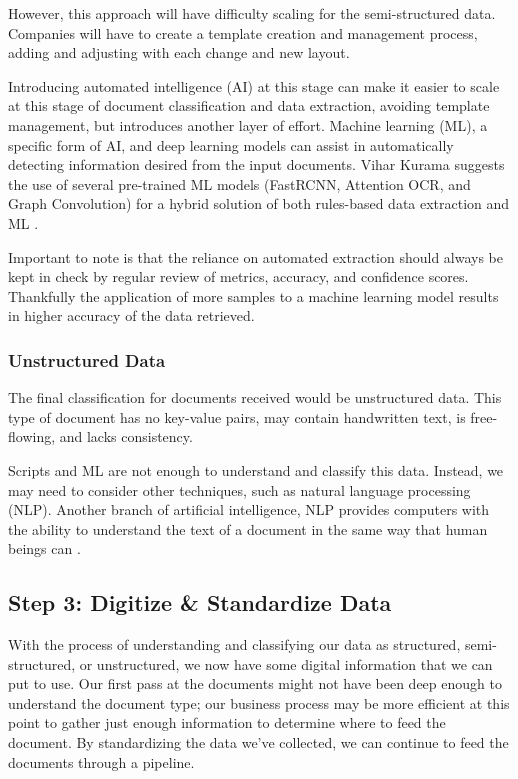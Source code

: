 \documentclass[conference]{IEEEtran}
\begin{document}
However, this approach will have difficulty scaling for the semi-structured data. Companies will have to create a template creation and management process, adding and adjusting with each change and new layout.

Introducing automated intelligence (AI) at this stage can make it easier to scale at this stage of document classification and data extraction, avoiding template management, but introduces another layer of effort. Machine learning (ML), a specific form of AI, and deep learning models can assist in automatically detecting information desired from the input documents. Vihar Kurama suggests the use of several pre-trained ML models (FastRCNN, Attention OCR, and Graph Convolution) for a hybrid solution of both rules-based data extraction and ML \cite{kurama2021a}.

Important to note is that the reliance on automated extraction should always be kept in check by regular review of metrics, accuracy, and confidence scores. Thankfully the application of more samples to a machine learning model results in higher accuracy of the data retrieved.

\subsubsection{Unstructured Data}
The final classification for documents received would be unstructured data. This type of document has no key-value pairs, may contain handwritten text, is free-flowing, and lacks consistency.

Scripts and ML are not enough to understand and classify this data. Instead, we may need to consider other techniques, such as natural language processing (NLP). Another branch of artificial intelligence, NLP provides computers with the ability to understand the text of a document in the same way that human beings can \cite{ibm2020natural}.

\subsection{Step 3: Digitize \& Standardize Data}
With the process of understanding and classifying our data as structured, semi-structured, or unstructured, we now have some digital information that we can put to use. Our first pass at the documents might not have been deep enough to understand the document type; our business process may be more efficient at this point to gather just enough information to determine where to feed the document. By standardizing the data we've collected, we can continue to feed the documents through a pipeline.
\end{document}
